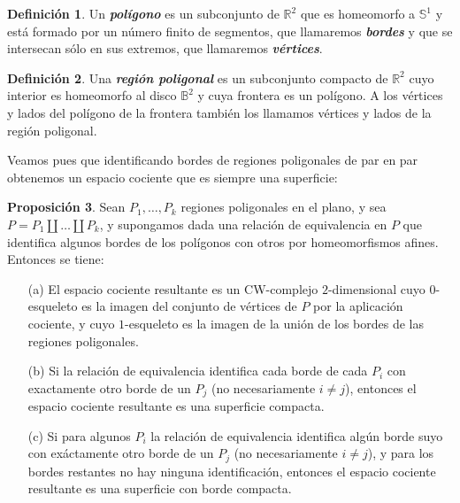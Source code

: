 \documentclass[10pt]{report}
\newcommand{\R}{\mathbb{R}}
\newcommand{\enfatiza}[1]{\textbf{\textit{#1}}}
\theoremstyle{definition}
\newtheorem{defin}{Definición}[section]
\newtheorem{prop}[defin]{Proposición}
\begin{document}
\begin{defin}%
Un \enfatiza{polígono} es un subconjunto de $\R^2$ que es homeomorfo a $\mathbb{S}^1$ y está formado por un número finito de segmentos, que llamaremos \enfatiza{bordes} y que se intersecan sólo en sus extremos, que llamaremos \enfatiza{vértices}. %
\end{defin}

\begin{defin}%

Una \enfatiza{región poligonal} es un subconjunto compacto de $\R^2$ cuyo interior es homeomorfo al disco $\mathbb{B}^2$ y cuya frontera es un polígono.
A los vértices y lados del polígono de la frontera también los llamamos vértices y lados de la región poligonal.
\end{defin} 

Veamos pues que identificando bordes de regiones poligonales de par en par obtenemos un espacio cociente que es siempre una superficie:

\begin{prop}%
\label{prop:poligonos}
Sean $P_1,\dots, P_k$ regiones poligonales en el plano, y sea $P=P_1\amalg \dots \amalg P_k$, y supongamos dada una relación de equivalencia en $P$ que identifica algunos bordes de los polígonos con otros por homeomorfismos afines. Entonces se tiene:
\begin{itemize}
\item[(a)] El espacio cociente resultante es un CW-complejo $2$-dimensional cuyo $0$-esqueleto es la imagen del conjunto de vértices de $P$ por la aplicación cociente, y cuyo $1$-esqueleto es la imagen de la unión de los bordes de las regiones poligonales.
\item[(b)] Si la relación de equivalencia identifica cada borde de cada $P_i$ con exactamente otro borde de un $P_j$ (no necesariamente $i\neq j$), entonces el espacio cociente resultante es una superficie compacta.
\item[(c)] Si para algunos $P_i$ la relación de equivalencia identifica algún borde suyo con exáctamente otro borde de un $P_j$ (no necesariamente $i\neq j$), y para los bordes restantes no hay ninguna identificación, entonces el espacio cociente resultante es una superficie con borde compacta.
\end{itemize}
\end{prop}
\end{document}
